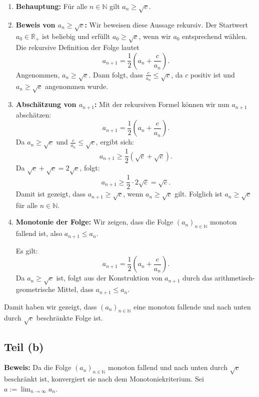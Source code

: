 \documentclass[11pt]{article}
\begin{document}
\begin{enumerate}
    \item \textbf{Behauptung:} Für alle \( n \in \mathbb{N} \) gilt \( a_n \geq \sqrt{c} \).

    \item \textbf{Beweis von \( a_n \geq \sqrt{c} \):} Wir beweisen diese Aussage rekursiv. Der Startwert \( a_0 \in \mathbb{R}_+ \) ist beliebig und erfüllt \( a_0 \geq \sqrt{c} \), wenn wir \( a_0 \) entsprechend wählen. Die rekursive Definition der Folge lautet
    \[
    a_{n+1} = \frac{1}{2} \left( a_n + \frac{c}{a_n} \right).
    \]
    Angenommen, \( a_n \geq \sqrt{c} \). Dann folgt, dass \( \frac{c}{a_n} \leq \sqrt{c} \), da \( c \) positiv ist und \( a_n \geq \sqrt{c} \) angenommen wurde.

    \item \textbf{Abschätzung von \( a_{n+1} \):} Mit der rekursiven Formel können wir nun \( a_{n+1} \) abschätzen:
    \[
    a_{n+1} = \frac{1}{2} \left( a_n + \frac{c}{a_n} \right).
    \]
    Da \( a_n \geq \sqrt{c} \) und \( \frac{c}{a_n} \leq \sqrt{c} \), ergibt sich:
    \[
    a_{n+1} \geq \frac{1}{2} \left( \sqrt{c} + \sqrt{c} \right).
    \]
    Da \( \sqrt{c} + \sqrt{c} = 2 \sqrt{c} \), folgt:
    \[
    a_{n+1} \geq \frac{1}{2} \cdot 2 \sqrt{c} = \sqrt{c}.
    \]
    Damit ist gezeigt, dass \( a_{n+1} \geq \sqrt{c} \), wenn \( a_n \geq \sqrt{c} \) gilt. Folglich ist \( a_n \geq \sqrt{c} \) für alle \( n \in \mathbb{N} \).

    \item \textbf{Monotonie der Folge:} Wir zeigen, dass die Folge \( (a_n)_{n \in \mathbb{N}} \) monoton fallend ist, also \( a_{n+1} \leq a_n \).

    Es gilt:
    \[
    a_{n+1} = \frac{1}{2} \left( a_n + \frac{c}{a_n} \right).
    \]
    Da \( a_n \geq \sqrt{c} \) ist, folgt aus der Konstruktion von \( a_{n+1} \) durch das arithmetisch-geometrische Mittel, dass \( a_{n+1} \leq a_n \).
\end{enumerate}

Damit haben wir gezeigt, dass \( (a_n)_{n \in \mathbb{N}} \) eine monoton fallende und nach unten durch \( \sqrt{c} \) beschränkte Folge ist.

\subsection*{Teil (b)}

\textbf{Beweis:} Da die Folge \( (a_n)_{n \in \mathbb{N}} \) monoton fallend und nach unten durch \( \sqrt{c} \) beschränkt ist, konvergiert sie nach dem Monotoniekriterium. Sei \( a := \lim_{n \to \infty} a_n \).
\end{document}
